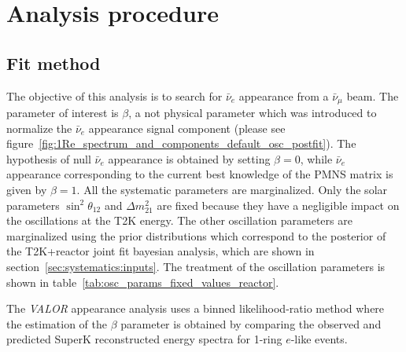 \clearpage

\section {Analysis procedure}
\label{sec:oscfit}

\subsection {Fit method}
\label{sec:oscfit_method}

The objective of this analysis is to search for $\bar{\nu}_e$ appearance from a $\bar{\nu}_{\mu}$ beam.
The parameter of interest is $\beta$, a not physical parameter which was introduced to normalize the $\bar{\nu}_e$ appearance signal component
(please see figure~\ref{fig:1Re_spectrum_and_components_default_osc_postfit}).
The hypothesis of null $\bar{\nu}_e$ appearance is obtained by setting $\beta = 0$, 
while $\bar{\nu}_e$ appearance corresponding to the current best knowledge of the PMNS matrix is given by $\beta = 1$.
All the systematic parameters are marginalized.
Only the solar parameters 
$\sin^2 \theta_{12}$ 
and 
$\Delta m^2_{21}$ 
are fixed because they have a negligible 
impact on the oscillations at the T2K energy. 
The other oscillation parameters are marginalized using the prior distributions which correspond to 
the posterior of the T2K+reactor joint fit bayesian analysis, which are shown in section~\ref{sec:systematics:inputs}. 
The treatment of the oscillation parameters is shown in table~\ref{tab:osc_params_fixed_values_reactor}.


The {\em VALOR} appearance analysis uses a binned likelihood-ratio method where
the estimation of the $\beta$ parameter is obtained
by comparing the observed and predicted SuperK reconstructed energy spectra
for 1-ring $e$-like events.

